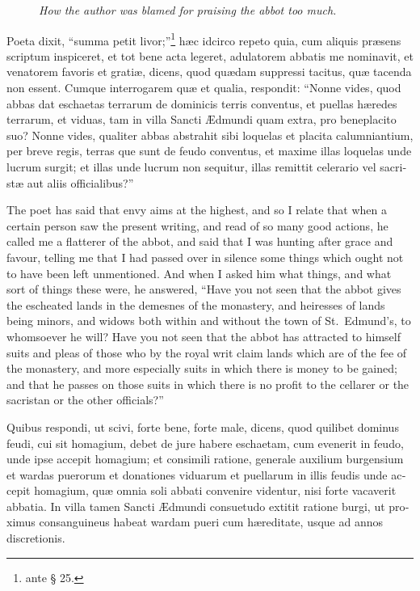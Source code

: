 \documentclass[10pt]{book}
\newcommand{\blockhead}[4][]{
\begin{figure}
\centering
\vspace{#4}
\parbox{2.75cm}{\begin{center}\footnotesize \color{BrickRed} \emph{#2}\\ #1 \end{center}}
\end{figure}
}
\begin{document}
\begin{paracol}{2}
\switchcolumn*

\clearpage

\begin{otherlanguage}{latin}
\blockhead{How the author was blamed for praising the abbot too much.}{4}{-.1cm}
Poeta dixit, ``summa petit livor;''\footnote[\textdagger]{ante \S{} 25.} h\ae{}c idcirco repeto quia, cum aliquis pr\ae{}sens scriptum inspiceret, et tot bene acta legeret, adulatorem abbatis me nominavit, et venatorem favoris et grati\ae{}, dicens, quod qu\ae{}dam suppressi tacitus, qu\ae{} tacenda non essent. Cumque interrogarem qu\ae{} et qualia, respondit: ``Nonne vides, quod abbas dat eschaetas terrarum de dominicis terris conventus, et puellas h\ae{}redes terrarum, et viduas, tam in villa Sancti \AE{}dmundi quam extra, pro beneplacito suo? Nonne vides, qualiter abbas abstrahit sibi loquelas et placita calumniantium, per breve regis, terras que sunt de feudo conventus, et maxime illas loquelas unde lucrum surgit; et illas unde lucrum non sequitur, illas remittit celerario vel sacrist\ae{} aut aliis officialibus?''

\end{otherlanguage}

\switchcolumn

The poet has said that envy aims at the highest, and so I relate that when a certain person saw the present writing, and read of so many good actions, he called me a flatterer of the abbot, and said that I was hunting after grace and favour, telling me that I had passed over in silence some things which ought not to have been left unmentioned. And when I asked him what things, and what sort of things these were, he answered, ``Have you not seen that the abbot gives the escheated lands in the demesnes of the monastery, and heiresses of lands being minors, and widows both within and without the town of St.\ Edmund's, to whomsoever he will? Have you not seen that the abbot has attracted to himself suits and pleas of those who by the royal writ claim lands which are of the fee of the monastery, and more especially suits in which there is money to be gained; and that he passes on those suits in which there is no profit to the cellarer or the sacristan or the other officials?''

\switchcolumn*

\begin{otherlanguage}{latin}
Quibus respondi, ut scivi, forte bene, forte male, dicens, quod quilibet dominus feudi, cui sit homagium, debet de jure habere eschaetam, cum evenerit in feudo, unde ipse accepit homagium; et consimili ratione, generale auxilium burgensium et wardas puerorum et donationes viduarum et puellarum in illis feudis unde accepit homagium, qu\ae{} omnia soli abbati convenire videntur, nisi forte vacaverit abbatia. In villa tamen Sancti \AE{}dmundi consuetudo extitit ratione burgi, ut proximus consanguineus habeat wardam pueri cum h\ae{}reditate, usque ad annos discretionis.
\end{otherlanguage}


\end{paracol}
\end{document}
